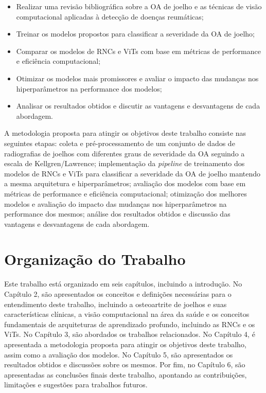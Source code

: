 \begin{itemize}
    \item Realizar uma revisão bibliográfica sobre a OA de joelho e as técnicas de visão computacional aplicadas à detecção de doenças reumáticas;
    \item Treinar os modelos propostos para classificar a severidade da OA de joelho;
    \item Comparar os modelos de RNCs e ViTs com base em métricas de performance e eficiência computacional;
    \item Otimizar os modelos mais promissores e avaliar o impacto das mudanças nos hiperparâmetros na performance dos modelos;
    \item Analisar os resultados obtidos e discutir as vantagens e desvantagens de cada abordagem.
\end{itemize}

A metodologia proposta para atingir os objetivos deste trabalho consiste nas seguintes etapas: coleta e pré-processamento de um conjunto de dados de radiografias de joelhos com diferentes graus de severidade da OA seguindo a escala de Kellgren/Lawrence; implementação da \textit{pipeline} de treinamento dos modelos de RNCs e ViTs para classificar a severidade da OA de joelho mantendo a mesma arquitetura e hiperparâmetros; avaliação dos modelos com base em métricas de performance e eficiência computacional; otimização dos melhores modelos e avaliação do impacto das mudanças nos hiperparâmetros na performance dos mesmos; análise dos resultados obtidos e discussão das vantagens e desvantagens de cada abordagem.

\section{Organização do Trabalho}

Este trabalho está organizado em seis capítulos, incluindo a introdução. No Capítulo 2, são apresentados os conceitos e definições necessárias para o entendimento deste trabalho, incluindo a osteoartrite de joelhos e suas características clínicas, a visão computacional na área da saúde e os conceitos fundamentais de arquiteturas de aprendizado profundo, incluindo as RNCs e os ViTs. No Capítulo 3, são abordados os trabalhos relacionados. No Capítulo 4, é apresentada a metodologia proposta para atingir os objetivos deste trabalho, assim como a avaliação dos modelos. No Capítulo 5, são apresentados os resultados obtidos e discussões sobre os mesmos. Por fim, no Capítulo 6, são apresentadas as conclusões finais deste trabalho, apontando as contribuições, limitações e sugestões para trabalhos futuros.